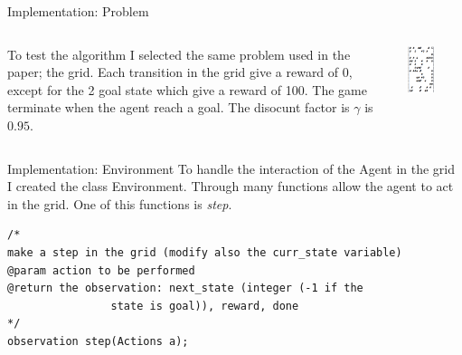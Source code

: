 \documentclass{beamer}
\begin{document}
\begin{frame}{Implementation: Problem}
\begin{columns}
	\begin{column}{0.5\textwidth}
	 To test the algorithm I selected the same problem used in the paper; the grid. Each transition in the grid give a reward of $0$, except for the 2 goal state which give a reward of 100. The game terminate when the agent reach a goal. The disocunt factor is $\gamma$ is $0.95$.
	\end{column}
	\begin{column}{0.5\textwidth}  %
		\begin{center}
			\includegraphics[width=0.5\textwidth]{grid.png}
		\end{center}
	\end{column}
\end{columns}
\end{frame}

\begin{frame}[fragile]{Implementation: Environment}
To handle the interaction of the Agent in the grid I created the class Environment. Through many functions allow the agent to act in the grid. One of this functions is \emph{step}.
\begin{lstlisting}
/*
make a step in the grid (modify also the curr_state variable)
@param action to be performed
@return the observation: next_state (integer (-1 if the 
			    state is goal)), reward, done
*/
observation step(Actions a);
\end{lstlisting}
\end{frame}
\end{document}
